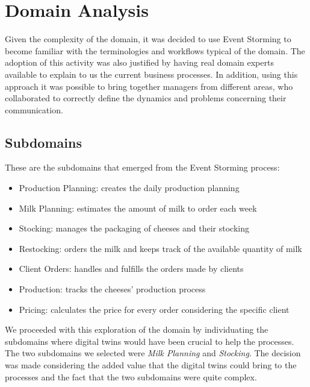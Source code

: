 \chapter{Domain Analysis}
Given the complexity of the domain, it was decided to use Event Storming to become familiar with the terminologies and workflows typical of the domain. The adoption of this activity was also justified by having real domain experts available to explain to us the current business processes. In addition, using this approach it was possible to bring together managers from different areas, who collaborated to correctly define the dynamics and problems concerning their communication.

\section{Subdomains}
These are the subdomains that emerged from the Event Storming process:
\begin{itemize}
    \item Production Planning: creates the daily production planning
    \item Milk Planning: estimates the amount of milk to order each week
    \item Stocking: manages the packaging of cheeses and their stocking
    \item Restocking: orders the milk and keeps track of the available quantity of milk
    \item Client Orders: handles and fulfills the orders made by clients
    \item Production: tracks the cheeses' production process
    \item Pricing: calculates the price for every order considering the specific client
\end{itemize}

We proceeded with this exploration of the domain by individuating the subdomains where digital twins would have been crucial to help the processes.
The two subdomains we selected were \textit{Milk Planning} and \textit{Stocking}.
The decision was made considering the added value that the digital twins could bring to the processes and the fact that the two subdomains were quite complex.

